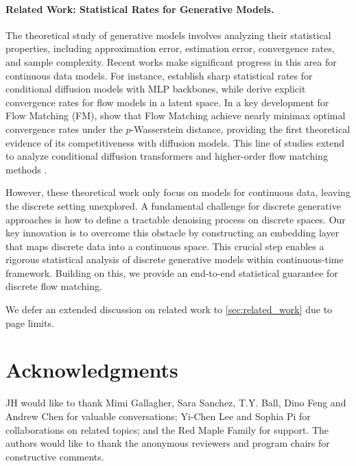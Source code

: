 \documentclass[12pt]{article}
\numberwithin{equation}{section}
\let\cite\citep
\theoremstyle{theoremstyle}
\numberwithin{equation}{section}
\numberwithin{theorem}{section}
\numberwithin{proposition}{section}
\numberwithin{definition}{section}
\numberwithin{lemma}{section}
\numberwithin{assumption}{section}
\numberwithin{remark}{section}
\begin{document}
\paragraph{Related Work: Statistical Rates for Generative Models.} 
The theoretical study of generative models involves analyzing their statistical properties, including approximation error, estimation error, convergence rates, and sample complexity. 
Recent works make significant progress in this area for continuous data models. 
For instance, \citet{fu2024unveil} establish sharp statistical rates for conditional diffusion models with MLP backbones, while \citet{jiao2024convergence} derive explicit convergence rates for flow models in a latent space.
In a key development for Flow Matching (FM), \citet{fukumizu2024flow} show that Flow Matching achieve nearly minimax optimal convergence rates under the $p$-Wasserstein distance, providing the first theoretical evidence of its competitiveness with diffusion models. This line of studies extend to analyze conditional diffusion transformers \cite{hu2024statistical} and higher-order flow matching methods \cite{su2025high}.

However, these theoretical work only focus on models for continuous data, leaving the discrete setting unexplored. 
A fundamental challenge for discrete generative approaches is how to define a tractable denoising process on discrete spaces. 
Our key innovation is to overcome this obstacle by constructing an embedding layer that maps discrete data into a continuous space. 
This crucial step enables a rigorous statistical analysis of discrete generative models within continuous-time framework.
Building on this, we provide an end-to-end statistical guarantee for discrete flow matching.

We defer an extended discussion on related work to \cref{sec:related_work} due to page limits.


\clearpage

\section*{Acknowledgments}
JH would like to thank Mimi Gallagher, Sara Sanchez, T.Y. Ball, Dino Feng and Andrew Chen for valuable conversations; Yi-Chen Lee and Sophia Pi for collaborations on related topics; and the Red Maple Family for support.
The authors would like to thank the anonymous reviewers and program chairs for constructive comments.
\end{document}
